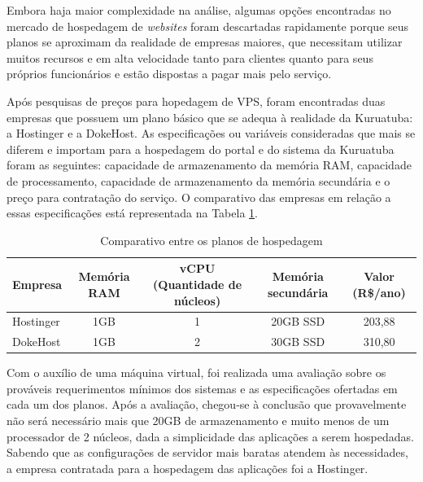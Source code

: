Embora haja maior complexidade na análise, algumas opções encontradas no mercado de hospedagem de \textit{websites} foram descartadas rapidamente porque seus planos se aproximam da realidade de empresas maiores, que necessitam utilizar muitos recursos e em alta velocidade tanto para clientes quanto para seus próprios funcionários e estão dispostas a pagar mais pelo serviço. 

Após pesquisas de preços para hopedagem de VPS, foram encontradas duas empresas que possuem um plano básico que se adequa à realidade da Kuruatuba: a Hostinger e a DokeHost. As especificações ou variáveis consideradas que mais se diferem e importam para a hospedagem do portal e do sistema da Kuruatuba foram as seguintes: capacidade de armazenamento da memória RAM, capacidade de processamento, capacidade de armazenamento da memória secundária e o preço para contratação do serviço. O comparativo das empresas em relação a essas especificações está representada na Tabela \ref{comparativo-hospedagem}.

\begin{table}[h]
\centering
{}
\caption{Comparativo entre os planos de hospedagem}
\vspace{0.5cm}

\setlength{\extrarowheight}{0.15cm}
\begin{tabular}{l|c|c|c|c}
 
\textbf{Empresa} & \textbf{Memória RAM} & \textbf{vCPU (Quantidade de núcleos)} & \textbf{Memória secundária} & \textbf{Valor (R\$/ano)} \\ %
\hline                               %
Hostinger & 1GB & 1 & 20GB SSD & 203,88 \\
DokeHost & 1GB & 2 & 30GB SSD & 310,80  \\ 

\hline   
\end{tabular}
\label{comparativo-hospedagem}
\end{table}

Com o auxílio de uma máquina virtual, foi realizada uma avaliação sobre os prováveis requerimentos mínimos dos sistemas e as especificações ofertadas em cada um dos planos. Após a avaliação, chegou-se à conclusão que provavelmente não será necessário mais que 20GB de armazenamento e muito menos de um processador de 2 núcleos, dada a simplicidade das aplicações a serem hospedadas. Sabendo que as configurações de servidor mais baratas atendem às necessidades, a empresa contratada para a hospedagem das aplicações foi a Hostinger.   

